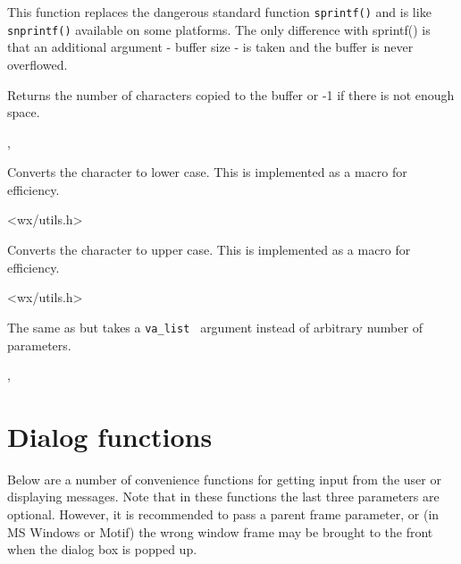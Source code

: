 \label{wxsnprintf}


This function replaces the dangerous standard function {\tt sprintf()} and is
like {\tt snprintf()} available on some platforms. The only difference with
sprintf() is that an additional argument - buffer size - is taken and the
buffer is never overflowed.

Returns the number of characters copied to the buffer or -1 if there is not
enough space.


, 

\label{wxtolower}


Converts the character to lower case. This is implemented as a macro for efficiency.


<wx/utils.h>

\label{wxtoupper}


Converts the character to upper case. This is implemented as a macro for efficiency.


<wx/utils.h>

\label{wxvsnprintf}


The same as  but takes a {\tt va\_list }
argument instead of arbitrary number of parameters.


, 

\section{Dialog functions}\label{dialogfunctions}

Below are a number of convenience functions for getting input from the
user or displaying messages. Note that in these functions the last three
parameters are optional. However, it is recommended to pass a parent frame
parameter, or (in MS Windows or Motif) the wrong window frame may be brought to
the front when the dialog box is popped up.

